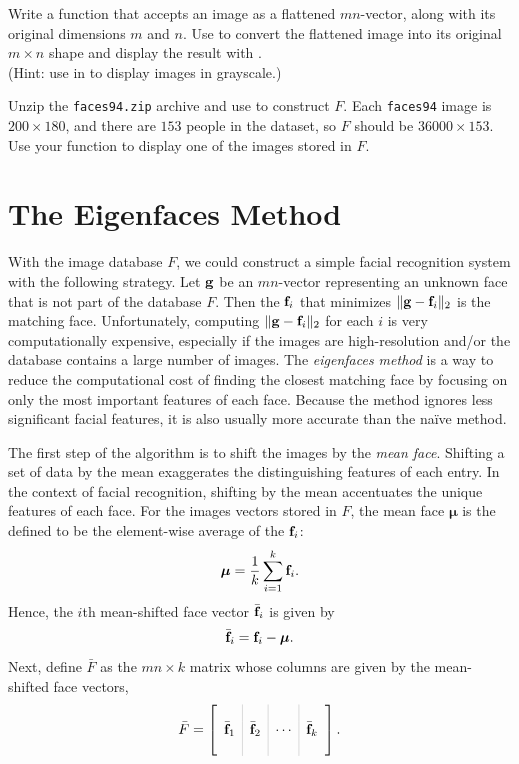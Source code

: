 \begin{problem} %
Write a function that accepts an image as a flattened $mn$-vector, along with its original dimensions $m$ and $n$.
Use  to convert the flattened image into its original $m\times n$ shape and display the result with .
\\ (Hint: use  in  to display images in grayscale.)

Unzip the \texttt{faces94.zip} archive and use  to construct $F$.
Each \texttt{faces94} image is $200 \times 180$, and there are $153$ people in the dataset, so $F$ should be $36000 \times 153$.
Use your function to display one of the images stored in $F$.
\label{prob:visualize-faces}
\end{problem}

\section*{The Eigenfaces Method} %

With the image database $F$, we could construct a simple facial recognition system with the following strategy.
Let $\mathbf{g}$ be an $mn$-vector representing an unknown face that is not part of the database $F$.
Then the $\mathbf{f}_i$ that minimizes $\|\mathbf{g} - \mathbf{f}_i\|_2$ is the matching face.
Unfortunately, computing $\|\mathbf{g} - \mathbf{f}_i\|_2$ for each $i$ is very computationally expensive, especially if the images are high-resolution and/or the database contains a large number of images.
The \emph{eigenfaces method} is a way to reduce the computational cost of finding the closest matching face by focusing on only the most important features of each face.
Because the method ignores less significant facial features, it is also usually more accurate than the na\"ive method.

The first step of the algorithm is to shift the images by the \emph{mean face}.
Shifting a set of data by the mean exaggerates the distinguishing features of each entry.
In the context of facial recognition, shifting by the mean accentuates the unique features of each face.
For the images vectors stored in $F$, the mean face $\boldsymbol{\mu}$ is the defined to be the element-wise average of the $\mathbf{f}_i$:
\[
\boldsymbol{\mu} = \frac{1}{k}\sum_{i=1}^k \mathbf{f}_i.
\]
Hence, the $i$th mean-shifted face vector $\bar{\mathbf{f}}_i$ is given by
\[
\bar{\mathbf{f}}_i = \mathbf{f}_i - \boldsymbol{\mu}.
\]
Next, define $\bar{F}$ as the $mn \times k$ matrix whose columns are given by the mean-shifted face vectors,
\[
\bar{F} = \left[\begin{array}{c|c|c|c}
\arrayrulecolor{lightgray}
& & & \\
\bar{\f}_1 & \bar{\f}_2 & \cdots & \bar{\f}_k
\\
& & &
\end{array}\right].
\]

